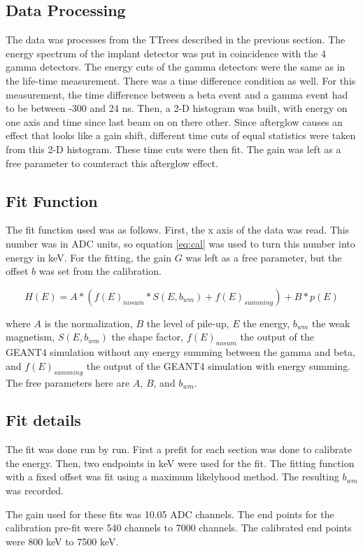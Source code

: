\subsection{Data Processing}
The data was processes from the TTrees described in the previous section.
The energy spectrum of the implant detector was put in coincidence with the 4 gamma detectors.
The energy cuts of the gamma detectors were the same as in the life-time measurement.
There was a time difference condition as well.
For this measurement, the time difference between a beta event and a gamma event had to be between -300 and 24 ns.
Then, a 2-D histogram was built, with energy on one axis and time since last beam on on there other.
Since afterglow causes an effect that looks like a gain shift, different time cuts of equal statistics were taken from this 2-D histogram. 
These time cuts were then fit. 
The gain was left as a free parameter to counteract this afterglow effect.

\subsection{Fit Function}
The fit function used was as follows.
First, the x axis of the data was read.
This number was in ADC units, so equation \ref{eq:cal} was used to turn this number into energy in keV.
For the fitting, the gain $G$ was left as a free parameter, but the offset $b$ was set from the calibration.

\begin{equation}
	H(E) = A * (f(E)_{nosum} * S(E,b_{wm}) + f(E)_{summing}) + B*p(E)
	\label{eq:betafit}
\end{equation}

where $A$ is the normalization, $B$ the level of pile-up, $E$ the energy, $b_{wm}$ the weak magnetism, $S(E,b_{wm})$ the shape factor, $f(E)_{nosum}$ the output of the GEANT4 simulation without any energy summing between the gamma and beta, and $f(E)_{summing}$ the output of the GEANT4 simulation with energy summing.
The free parameters here are $A$, $B$, and $b_{wm}$.

\subsection{Fit details}
The fit was done run by run.
First a prefit for each section was done to calibrate the energy.
Then, two endpoints in keV were used for the fit.
The fitting function with a fixed offset was fit using a maximum likelyhood method.
The resulting $b_{wm}$ was recorded.

The gain used for these fits was 10.05 ADC channels.
The end points for the calibration pre-fit were 540 channels to 7000 channels.
The calibrated end points were 800 keV to 7500 keV. 
 
